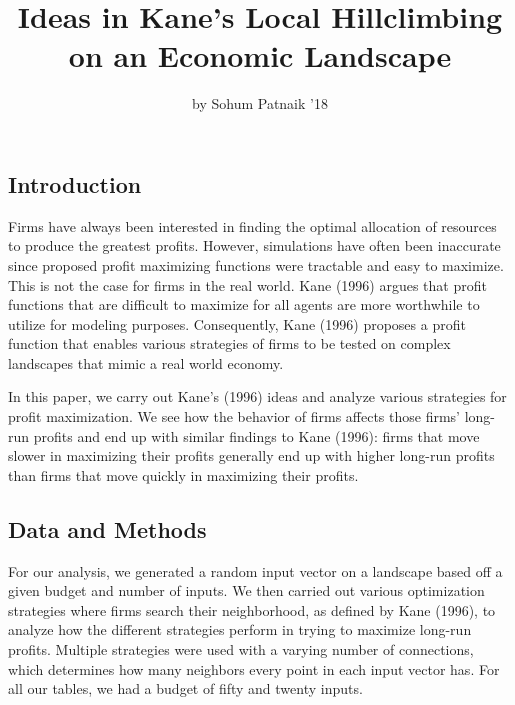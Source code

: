 \title{Ideas in Kane's Local Hillclimbing on an Economic Landscape}
\author{by Sohum Patnaik '18}

\maketitle


\subsection{Introduction}\label{introduction}

Firms have always been interested in finding the optimal allocation of
resources to produce the greatest profits. However, simulations have
often been inaccurate since proposed profit maximizing functions were
tractable and easy to maximize. This is not the case for firms in the
real world. Kane (1996) argues that profit functions that are difficult
to maximize for all agents are more worthwhile to utilize for modeling
purposes. Consequently, Kane (1996) proposes a profit function that
enables various strategies of firms to be tested on complex landscapes
that mimic a real world economy.

In this paper, we carry out Kane's (1996) ideas and analyze various
strategies for profit maximization. We see how the behavior of firms
affects those firms' long-run profits and end up with similar findings
to Kane (1996): firms that move slower in maximizing their profits
generally end up with higher long-run profits than firms that move
quickly in maximizing their profits.

\subsection{Data and Methods}\label{data-and-methods}

For our analysis, we generated a random input vector on a landscape
based off a given budget and number of inputs. We then carried out
various optimization strategies where firms search their neighborhood,
as defined by Kane (1996), to analyze how the different strategies
perform in trying to maximize long-run profits. Multiple strategies were
used with a varying number of connections, which determines how many
neighbors every point in each input vector has. For all our tables,
we had a budget of fifty and twenty inputs.

